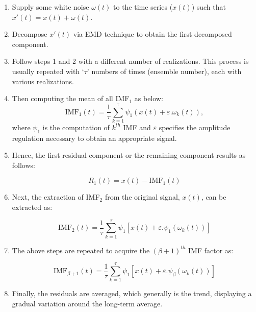 \begin{enumerate}
    \item Supply some white noise $\omega(t)$ to the time series ($x(t)$) such that $x'(t) = x(t) + \omega(t)$.

    \item Decompose $x'(t)$ via \ac{EMD} technique to obtain the first decomposed component.

    \item Follow steps 1 and 2 with a different number of realizations. This process is usually repeated with `$\tau$' numbers of times (ensemble number), each with various realizations.

    \item Then computing the mean of all IMF$_1$ as below:
    \begin{equation}
        \text{IMF}_1(t) = \frac{1}{\tau} \sum^\tau_{k=1} \psi_1 \left(x(t) + \varepsilon.\omega_k(t)\right),
    \end{equation}
where $\psi_1$ is the computation of $k^{th}$ IMF and $\varepsilon$ specifies the amplitude regulation necessary to obtain an appropriate signal.

    \item Hence, the first residual component or the remaining component results as follows:

    \begin{equation}
        R_1(t) = x(t) - \text{IMF}_1(t)
    \end{equation}

    \item Next, the extraction of IMF$_2$ from the original signal, $x(t)$, can be extracted as:

    \begin{equation}
        \text{IMF}_2(t) = \frac{1}{\tau} \sum^\tau_{k=1} \psi_1 \left[ x(t) + \varepsilon.\psi_1 \left( \omega_k(t) \right) \right]
    \end{equation}

    \item The above steps are repeated to acquire the $(\beta + 1)^{th}$ \ac{IMF} factor as:

    \begin{equation}
        \text{IMF}_{\beta+1}(t) = \frac{1}{\tau} \sum^\tau_{k=1} \psi_1 \left[ x(t) + \varepsilon.\psi_\beta \left( \omega_k(t) \right) \right]
    \end{equation}

    \item Finally, the residuals are averaged, which generally is the trend, displaying a gradual variation around the long-term average.
\end{enumerate}


